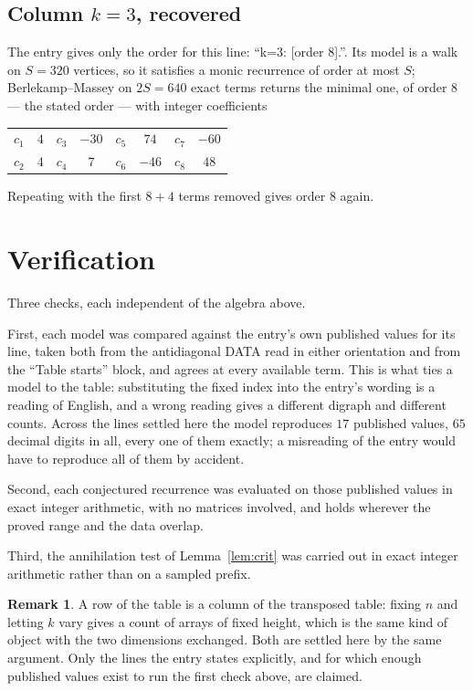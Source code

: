 \documentclass[11pt,a4paper]{article}
\theoremstyle{plain}
\theoremstyle{definition}
\newtheorem{remark}[theorem]{Remark}
\begin{document}
\subsection*{Column $k=3$, recovered}
The entry gives only the order for this line: ``k=3: [order 8].''. Its model is a walk on
$S=320$ vertices, so it satisfies a monic recurrence of order at most $S$;
Berlekamp--Massey on $2S=640$ exact terms returns the minimal one, of order
$8$ --- the stated order --- with integer coefficients
\begin{center}\small\begin{tabular}{cccccccc}
$c_{1}$ & $4$ & $c_{3}$ & $-30$ & $c_{5}$ & $74$ & $c_{7}$ & $-60$ \\
$c_{2}$ & $4$ & $c_{4}$ & $7$ & $c_{6}$ & $-46$ & $c_{8}$ & $48$ \\
\end{tabular}\end{center}
Repeating with the first $8+4$ terms removed gives order $8$ again.

\section{Verification}

Three checks, each independent of the algebra above.

First, each model was compared against the entry's own published values for its line, taken
both from the antidiagonal DATA read in either orientation and from the ``Table starts''
block, and agrees at every available term. This is what ties a model to the table:
substituting the fixed index into the entry's wording is a reading of English, and a wrong
reading gives a different digraph and different counts. Across the lines settled here the
model reproduces $17$ published values, $65$ decimal digits in all, every one of
them exactly; a misreading of the entry would have to reproduce all of them by accident.

Second, each conjectured recurrence was evaluated on those published values in exact
integer arithmetic, with no matrices involved, and holds wherever the proved range and the
data overlap.

Third, the annihilation test of Lemma~\ref{lem:crit} was carried out in exact integer
arithmetic rather than on a sampled prefix.

\begin{remark}
A row of the table is a column of the transposed table: fixing $n$ and letting $k$ vary gives a
count of arrays of fixed height, which is the same kind of object with the two dimensions
exchanged. Both are settled here by the same argument. Only the lines the entry states
explicitly, and for which enough published values exist to run the first check above, are
claimed.
\end{remark}
\end{document}
